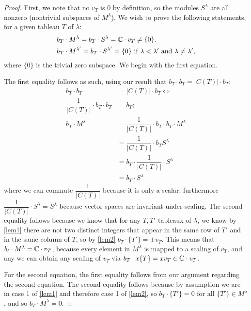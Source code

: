 \documentclass[12pt,twoside]{reedthesis}
\theoremstyle{plain}   %
\theoremstyle{definition}
\theoremstyle{remark}
\numberwithin{equation}{section}
\begin{document}
  \begin{proof}
    First, we note that no $v_T$ is $0$ by definition, so the modules $S^\lambda$ are all nonzero (nontrivial subspaces of $M^\lambda$).
    We wish to prove the following statements, for a given tableau $T$ of $\lambda$:
    \begin{align}
      &b_T \cdot M^\lambda = b_T \cdot S^\lambda = \mathbb{C} \cdot v_T \neq \{0\}. \\
      &b_T \cdot M^{\lambda'} = b_T \cdot S^{\lambda'} = \{0\} \text{ if $\lambda < \lambda'$ and $\lambda \neq \lambda'$,}
    \end{align}
    where $\{0\}$ is the trivial zero subspace.
    We begin with the first equation. \par
    The first equality follows as such, using our result that $b_T \cdot b_T = |C(T)| \cdot b_T$:
    \begin{align*}
      b_T \cdot b_T &= |C(T)| \cdot b_T \iff \\
      \dfrac{1}{|C(T)|} \cdot b_T \cdot b_T &= b_T;\\
      b_T \cdot M^\lambda &= \dfrac{1}{|C(T)|} \cdot b_T \cdot b_T \cdot M^\lambda \\
                    &=\dfrac{1}{|C(T)|} \cdot b_T S^\lambda \\
                    &= b_T \cdot \dfrac{1}{|C(T)|}  \cdot S^\lambda \\
                    &= b_T \cdot S^\lambda
    \end{align*}
    where we can commute $\dfrac{1}{|C(T)|}$ because it is only a scalar; furthermore $\dfrac{1}{|C(T)|}  \cdot S^\lambda = S^\lambda$
    because vector spaces are invariant under scaling.
    The second equality follows because we know that for any $T,T'$ tableaux of $\lambda$, we know by \cref{lem1} there are not
    two distinct integers that appear in the same row of $T'$ and in the same column of $T$, so by \cref{lem2}
    $b_T \cdot \{T'\} = \pm v_T$.
    This means that $b_t \cdot M^\lambda = \mathbb{C} \cdot v_T$,
    because every element in $M^\lambda$ is mapped to a scaling of $v_T$, and any we can obtain any scaling of $v_T$ via
    $b_T \cdot x \{T\} =x v_T \in \mathbb{C} \cdot v_T$. \par
    For the second equation, the first equality follows from our argument regarding the second equation.
    The second equality follows because by assumption we are in case 1 of \cref{lem1} and therefore case 1 of \cref{lem2},
    so $b_T \cdot \{T'\} = 0$ for all $\{T'\} \in M^\lambda$, and so $b_T \cdot M^\lambda = 0$.\par

\end{proof}
\end{document}
